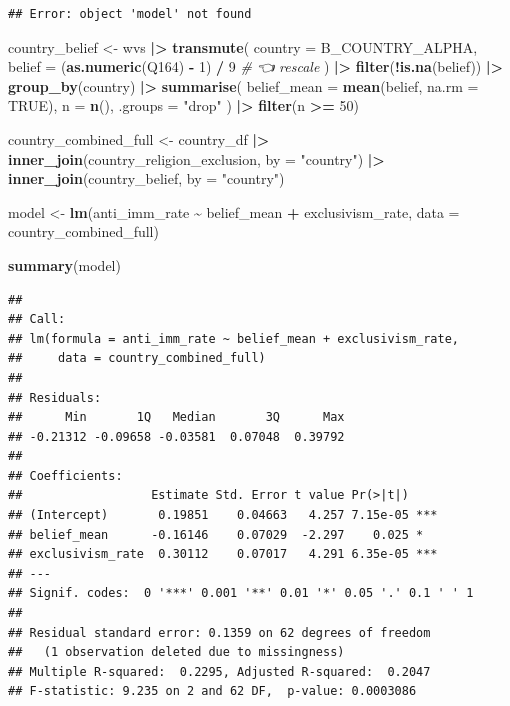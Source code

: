 \documentclass[
]{article}
\newenvironment{Shaded}{\begin{snugshade}}{\end{snugshade}}
\newcommand{\AttributeTok}[1]{\textcolor[rgb]{0.13,0.29,0.53}{#1}}
\newcommand{\CommentTok}[1]{\textcolor[rgb]{0.56,0.35,0.01}{\textit{#1}}}
\newcommand{\ConstantTok}[1]{\textcolor[rgb]{0.56,0.35,0.01}{#1}}
\newcommand{\DecValTok}[1]{\textcolor[rgb]{0.00,0.00,0.81}{#1}}
\newcommand{\FunctionTok}[1]{\textcolor[rgb]{0.13,0.29,0.53}{\textbf{#1}}}
\newcommand{\NormalTok}[1]{#1}
\newcommand{\OtherTok}[1]{\textcolor[rgb]{0.56,0.35,0.01}{#1}}
\newcommand{\SpecialCharTok}[1]{\textcolor[rgb]{0.81,0.36,0.00}{\textbf{#1}}}
\newcommand{\StringTok}[1]{\textcolor[rgb]{0.31,0.60,0.02}{#1}}
\begin{document}
\begin{verbatim}
## Error: object 'model' not found
\end{verbatim}

\begin{Shaded}
\begin{Highlighting}[]
\NormalTok{country\_belief }\OtherTok{\textless{}{-}}\NormalTok{ wvs }\SpecialCharTok{|\textgreater{}}
  \FunctionTok{transmute}\NormalTok{(}
    \AttributeTok{country =}\NormalTok{ B\_COUNTRY\_ALPHA,}
    \AttributeTok{belief =}\NormalTok{ (}\FunctionTok{as.numeric}\NormalTok{(Q164) }\SpecialCharTok{{-}} \DecValTok{1}\NormalTok{) }\SpecialCharTok{/} \DecValTok{9}   \CommentTok{\# 👈 rescale}
\NormalTok{  ) }\SpecialCharTok{|\textgreater{}}
  \FunctionTok{filter}\NormalTok{(}\SpecialCharTok{!}\FunctionTok{is.na}\NormalTok{(belief)) }\SpecialCharTok{|\textgreater{}}
  \FunctionTok{group\_by}\NormalTok{(country) }\SpecialCharTok{|\textgreater{}}
  \FunctionTok{summarise}\NormalTok{(}
    \AttributeTok{belief\_mean =} \FunctionTok{mean}\NormalTok{(belief, }\AttributeTok{na.rm =} \ConstantTok{TRUE}\NormalTok{),}
    \AttributeTok{n =} \FunctionTok{n}\NormalTok{(),}
    \AttributeTok{.groups =} \StringTok{"drop"}
\NormalTok{  ) }\SpecialCharTok{|\textgreater{}}
  \FunctionTok{filter}\NormalTok{(n }\SpecialCharTok{\textgreater{}=} \DecValTok{50}\NormalTok{)}

\NormalTok{country\_combined\_full }\OtherTok{\textless{}{-}}\NormalTok{ country\_df }\SpecialCharTok{|\textgreater{}}
  \FunctionTok{inner\_join}\NormalTok{(country\_religion\_exclusion, }\AttributeTok{by =} \StringTok{"country"}\NormalTok{) }\SpecialCharTok{|\textgreater{}}
  \FunctionTok{inner\_join}\NormalTok{(country\_belief, }\AttributeTok{by =} \StringTok{"country"}\NormalTok{)}

\NormalTok{model }\OtherTok{\textless{}{-}} \FunctionTok{lm}\NormalTok{(anti\_imm\_rate }\SpecialCharTok{\textasciitilde{}}\NormalTok{ belief\_mean }\SpecialCharTok{+}\NormalTok{ exclusivism\_rate,}
            \AttributeTok{data =}\NormalTok{ country\_combined\_full)}

\FunctionTok{summary}\NormalTok{(model)}
\end{Highlighting}
\end{Shaded}

\begin{verbatim}
## 
## Call:
## lm(formula = anti_imm_rate ~ belief_mean + exclusivism_rate, 
##     data = country_combined_full)
## 
## Residuals:
##      Min       1Q   Median       3Q      Max 
## -0.21312 -0.09658 -0.03581  0.07048  0.39792 
## 
## Coefficients:
##                  Estimate Std. Error t value Pr(>|t|)    
## (Intercept)       0.19851    0.04663   4.257 7.15e-05 ***
## belief_mean      -0.16146    0.07029  -2.297    0.025 *  
## exclusivism_rate  0.30112    0.07017   4.291 6.35e-05 ***
## ---
## Signif. codes:  0 '***' 0.001 '**' 0.01 '*' 0.05 '.' 0.1 ' ' 1
## 
## Residual standard error: 0.1359 on 62 degrees of freedom
##   (1 observation deleted due to missingness)
## Multiple R-squared:  0.2295, Adjusted R-squared:  0.2047 
## F-statistic: 9.235 on 2 and 62 DF,  p-value: 0.0003086
\end{verbatim}
\end{document}
